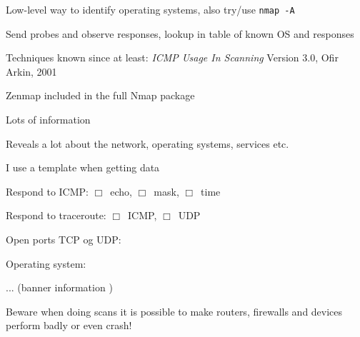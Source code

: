 \documentclass[Screen16to9,17pt]{foils}
\begin{document}
\begin{list2}
\item Low-level way to identify operating systems, also try/use
  \verb+nmap -A+
\item Send probes and observe responses, lookup in table of known OS and responses
\item Techniques known since at least: \emph{ICMP Usage In Scanning} Version 3.0,
  Ofir Arkin, 2001 %
\end{list2}


\centerline{Zenmap included in the full Nmap package }








\begin{list1}
\item Lots of information
\item Reveals a lot about the network, operating systems, services etc.
\item I use a template when getting data
  \begin{list2}
    \item Respond to ICMP: $\Box$\  echo, $\Box$\ mask, $\Box$\ time
\item Respond to traceroute: $\Box$\ ICMP, $\Box$\ UDP
\item Open ports TCP og UDP:
\item Operating system:
\item ... (banner information )
  \end{list2}
\item Beware when doing scans it is possible to make routers, firewalls and devices perform badly or even crash!
\end{list1}




\end{document}
